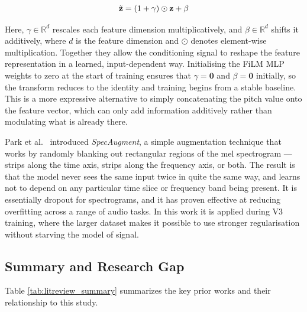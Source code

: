 \begin{equation}
  \tilde{\mathbf{z}} = (1 + \gamma) \odot \mathbf{z} + \beta
  \label{eq:film_bg}\eqname{FiLM feature-wise linear modulation}
\end{equation}

\noindent Here, $\gamma \in \mathbb{R}^d$ rescales each feature dimension multiplicatively, and $\beta \in \mathbb{R}^d$ shifts it additively, where $d$ is the feature dimension and $\odot$ denotes element-wise multiplication. Together they allow the conditioning signal to reshape the feature representation in a learned, input-dependent way. Initialising the FiLM MLP weights to zero at the start of training ensures that $\gamma = \mathbf{0}$ and $\beta = \mathbf{0}$ initially, so the transform reduces to the identity and training begins from a stable baseline. This is a more expressive alternative to simply concatenating the pitch value onto the feature vector, which can only add information additively rather than modulating what is already there.

\label{ssub:specaugment}
Park et al.\ \cite{park2019specaugment} introduced \textit{SpecAugment}, a simple augmentation technique that works by randomly blanking out rectangular regions of the mel spectrogram --- strips along the time axis, strips along the frequency axis, or both. The result is that the model never sees the same input twice in quite the same way, and learns not to depend on any particular time slice or frequency band being present. It is essentially dropout for spectrograms, and it has proven effective at reducing overfitting across a range of audio tasks. In this work it is applied during V3 training, where the larger dataset makes it possible to use stronger regularisation without starving the model of signal.

\subsection{Summary and Research Gap}

Table \ref{tab:litreview_summary} summarizes the key prior works and their relationship to this study.

